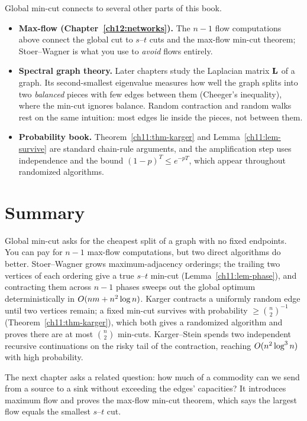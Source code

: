 \begin{connectionbox}
Global min-cut connects to several other parts of this book.
\begin{itemize}
  \item \textbf{Max-flow (Chapter~\ref{ch12:networks}).} The $n-1$ flow computations above connect the global cut to $s$--$t$ cuts and the max-flow min-cut theorem; Stoer--Wagner is what you use to \emph{avoid} flows entirely.
  \item \textbf{Spectral graph theory.} Later chapters study the Laplacian matrix $\mathbf{L}$ of a graph. Its second-smallest eigenvalue measures how well the graph splits into two \emph{balanced} pieces with few edges between them (Cheeger's inequality), where the min-cut ignores balance. Random contraction and random walks rest on the same intuition: most edges lie inside the pieces, not between them.
  \item \textbf{Probability book.} Theorem~\ref{ch11:thm-karger} and Lemma~\ref{ch11:lem-survive} are standard chain-rule arguments, and the amplification step uses independence and the bound $(1-p)^T\le e^{-pT}$, which appear throughout randomized algorithms.
\end{itemize}
\end{connectionbox}

\section*{Summary}

Global min-cut asks for the cheapest split of a graph with no fixed endpoints. You can pay for $n-1$ max-flow computations, but two direct algorithms do better. Stoer--Wagner grows maximum-adjacency orderings; the trailing two vertices of each ordering give a true $s$--$t$ min-cut (Lemma~\ref{ch11:lem-phase}), and contracting them across $n-1$ phases sweeps out the global optimum deterministically in $O(nm+n^2\log n)$. Karger contracts a uniformly random edge until two vertices remain; a fixed min-cut survives with probability $\ge\binom n2^{-1}$ (Theorem~\ref{ch11:thm-karger}), which both gives a randomized algorithm and proves there are at most $\binom n2$ min-cuts. Karger--Stein spends two independent recursive continuations on the risky tail of the contraction, reaching $O(n^2\log^3 n)$ with high probability.

The next chapter asks a related question: how much of a commodity can we send from a source to a sink without exceeding the edges' capacities? It introduces maximum flow and proves the max-flow min-cut theorem, which says the largest flow equals the smallest $s$--$t$ cut.


